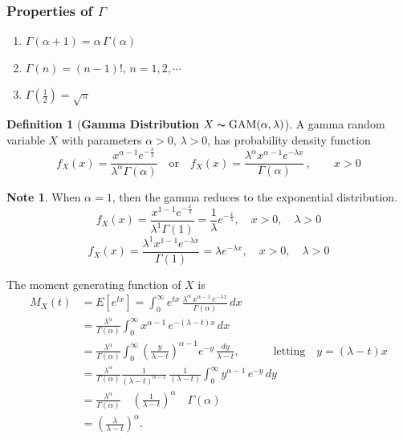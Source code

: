 \documentclass[12pt,a4paper]{report}
\theoremstyle{definition}
\newtheorem{definition}[thm]{Definition}
\newtheorem{note}[thm]{Note}
\theoremstyle{plain}
\theoremstyle{definition}
\begin{document}
\subsubsection{Properties of $\Gamma$}
\begin{enumerate}
\item[(i).] $\Gamma (\alpha + 1) = \alpha\,\Gamma(\alpha)$
\item[(ii).] $\Gamma(n) = (n-1)!, \, n = 1, 2, \cdots$
\item[(iii).] $\Gamma\left(\frac{1}{2}\right) = \sqrt{\pi}$
\end{enumerate}




\begin{definition}[\textbf{Gamma Distribution $X\thicksim \operatorname{GAM}(\alpha, \lambda)$}]
A gamma random variable $X$ with parameters $\alpha > 0, \, \lambda > 0$, has probability density function 
\[f_X(x) =\frac{x^{\alpha -1}e^{-\frac{x}{\lambda}}}{\lambda^{\alpha}\Gamma(\alpha)}\quad \text{or}\quad f_X(x) =\frac{\lambda^{\alpha}x^{\alpha-1}e^{-\lambda x}}{\Gamma(\alpha)}\, , \quad\quad  x>0\]
\end{definition}


\begin{note}
When $\alpha = 1$, then the gamma reduces to the exponential distribution.
\[f_X(x)  = \frac{x^{1-1}e^{-\frac{x}{\lambda}}}{\lambda^1 \Gamma(1)}=\frac{1}{\lambda}e^{-\frac{x}{\lambda}},\quad x>0,\quad\lambda >0\]
\[f_X(x)  = \frac{\lambda^1x^{1-1}e^{-\lambda x}}{\Gamma(1)}=\lambda e^{-\lambda x},\quad x>0,\quad \lambda >0\]
\end{note}




The moment generating function of $X$ is
\begin{align*}
M_X(t) &=E\left[e^{tx}\right]
=\int^{\infty}_{0} e^{tx}\,\frac{\lambda^{\alpha}\, x^{\alpha - 1}\, e^{-\lambda x}}{\Gamma(\alpha)}\, dx\\
& = \frac{\lambda^{\alpha}}{\Gamma(\alpha)}\int^{\infty}_0x^{\alpha - 1}\, e^{-(\lambda - t)x}\, dx\\
& =\frac{\lambda^{\alpha}}{\Gamma(\alpha)}\int^{\infty}_0\left(\frac{y}{\lambda -t}\right)^{\alpha -1}e^{-y}\, \frac{dy}{\lambda -t},\quad\quad\quad \text{letting}\quad y = (\lambda - t)x\\
&=\frac{\lambda^{\alpha}}{\Gamma(\alpha)}\frac{1}{(\lambda -t)^{\alpha-1}}\,\frac{1}{(\lambda - t)}\int^{\infty}_{0}y^{\alpha-1}\, e^{-y}\, dy\\ 
&=\frac{\lambda^{\alpha}}{\Gamma(\alpha)}\quad\left(\frac{1}{\lambda -t}\right)^{\alpha}\quad\Gamma(\alpha)\\
&=\left(\frac{\lambda}{\lambda-t}\right)^{\alpha}.
\end{align*}
\end{document}
